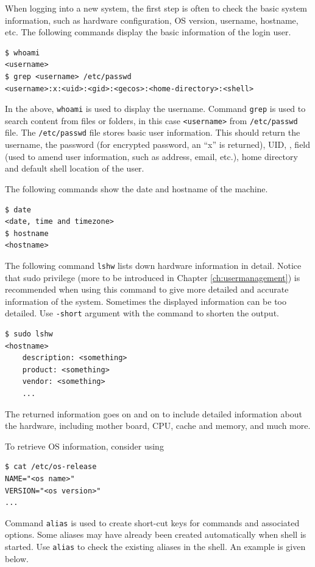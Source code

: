 When logging into a new system, the first step is often to check the basic system information, such as hardware configuration, OS version, username, hostname, etc. The following commands display the basic information of the login user.
\begin{lstlisting}
$ whoami
<username>
$ grep <username> /etc/passwd
<username>:x:<uid>:<gid>:<gecos>:<home-directory>:<shell>
\end{lstlisting}
In the above, \verb|whoami| is used to display the username. Command \verb|grep| is used to search content from files or folders, in this case \verb|<username>| from \verb|/etc/passwd| file. The \verb|/etc/passwd| file stores basic user information. This should return the username, the password (for encrypted password, an ``x'' is returned), UID, ,  field (used to amend user information, such as address, email, etc.), home directory and default shell location of the user.

The following commands show the date and hostname of the machine.
\begin{lstlisting}
$ date
<date, time and timezone>
$ hostname
<hostname>
\end{lstlisting}

The following command \verb|lshw| lists down hardware information in detail. Notice that sudo privilege (more to be introduced in Chapter \ref{ch:usermanagement}) is recommended when using this command to give more detailed and accurate information of the system. Sometimes the displayed information can be too detailed. Use \verb|-short| argument with the command to shorten the output.
\begin{lstlisting}
$ sudo lshw
<hostname>
    description: <something>
    product: <something>
    vendor: <something>
    ...
\end{lstlisting}
The returned information goes on and on to include detailed information about the hardware, including mother board, CPU, cache and memory, and much more.

To retrieve OS information, consider using
\begin{lstlisting}
$ cat /etc/os-release
NAME="<os name>"
VERSION="<os version>"
...
\end{lstlisting}

Command \verb|alias| is used to create short-cut keys for commands and associated options. Some aliases may have already been created automatically when shell is started. Use \verb|alias| to check the existing aliases in the shell. An example is given below.

